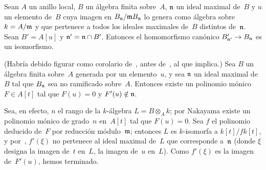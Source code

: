 \begin{lemme}
\label{I.7.9}
Sean $A$ un anillo local, $B$ un álgebra finita sobre~$A$, $\mathfrak{n}$ un ideal maximal de~$B$ y $u$ un elemento de~$B$ cuya imagen en $B_{\mathfrak{n}}/\mathfrak{m}B_{\mathfrak{n}}$ lo genera como álgebra sobre~$k=A/\mathfrak{m}$ y que pertenece a todos los ideales maximales de~$B$ distintos de~$\mathfrak{n}$. Sean
$B'=A[u]$ y $\mathfrak{n}'=\mathfrak{n}\cap B'$.%
Entonces el homomorfismo canónico $B'_{\mathfrak{n}'}\to B_{\mathfrak{n}}$ es un isomorfismo.
\end{lemme}

\begin{lemme}
\label{I.7.10}
(Habría debido figurar como corolario de~, antes de~, al que implica.) Sea $B$ un álgebra finita sobre~$A$ generada por un elemento~$u$, y sea $\mathfrak{n}$ un ideal maximal de~$B$ tal que $B_{\mathfrak{n}}$ sea no ramificado sobre~$A$. Entonces existe un polinomio mónico $F\in A[t]$ tal que $F(u)=0$ y $F'(u)\notin\mathfrak{n}$.
\end{lemme}

Sea, en efecto, $n$ el rango de la $k$-álgebra $L=B\otimes_Ak$; por Nakayama existe un polinomio mónico de grado~$n$ en~$A[t]$ tal que $F(u)=0$. Sea $f$ el polinomio deducido de~$F$ por reducción módulo~$\mathfrak{m}$; entonces $L$ es $k$-isomorfa a $k[t]/fk[t]$, y por~, $f'(\xi)$ no pertenece al ideal maximal de~$L$ que corresponde a~$\mathfrak{n}$ (donde $\xi$ designa la imagen de~$t$ en~$L$, \ie la imagen de~$u$ en~$L$). Como $f'(\xi)$ es la imagen de~$F'(u)$, hemos terminado.
